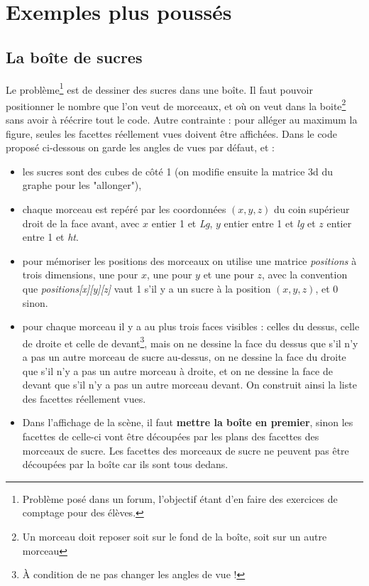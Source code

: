 \section{Exemples plus poussés}

\subsection{La boîte de sucres}

Le problème\footnote{Problème posé dans un forum, l'objectif étant d'en faire des exercices de comptage pour des élèves.} est de dessiner des sucres dans une boîte. Il faut pouvoir positionner le nombre que l'on veut de morceaux, et où on veut dans la boite\footnote{Un morceau doit reposer soit sur le fond de la boîte, soit sur un autre morceau} sans avoir à réécrire tout le code. Autre contrainte : pour alléger au maximum la figure, seules les facettes réellement vues doivent être affichées. Dans le code proposé ci-dessous on garde les angles de vues par défaut, et :
\begin{itemize}
    \item les sucres sont des cubes de côté 1 (on modifie ensuite la matrice 3d du graphe pour les "allonger"),
    \item chaque morceau est repéré par les coordonnées $(x,y,z)$ du coin supérieur droit de la face avant, avec $x$ entier 1 et \emph{Lg}, $y$ entier entre 1 et \emph{lg} et $z$ entier entre 1 et \emph{ht}.
    \item pour mémoriser les positions des morceaux on utilise une matrice \emph{positions} à trois dimensions, une pour $x$, une pour $y$ et une pour $z$, avec la convention que \emph{positions[x][y][z]} vaut 1 s'il y a un sucre à la position $(x,y,z)$, et 0 sinon.
    \item pour chaque morceau il y a au plus trois faces visibles : celles du dessus, celle de droite et celle de devant\footnote{À condition de ne pas changer les angles de vue !}, mais on ne dessine la face du dessus que s'il n'y a pas un autre morceau de sucre au-dessus, on ne dessine la face du droite que s'il n'y a pas un autre morceau à droite, et on ne dessine la face de devant que s'il n'y a pas un autre morceau devant. On construit ainsi la liste des facettes réellement vues.
    \item Dans l'affichage de la scène, il faut \textbf{mettre la boîte en premier}, sinon les facettes de celle-ci vont être découpées par les plans des facettes des morceaux de sucre. Les facettes des morceaux de sucre ne peuvent pas être découpées par la boîte car ils sont tous dedans.
\end{itemize}

